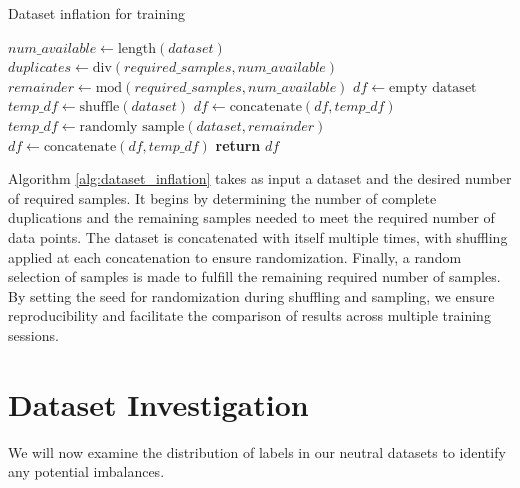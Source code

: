 \begin{algorithm}[H]
    \caption{Dataset inflation for training}
    \begin{algorithmic}[1]
        \State $num\_available \gets \text{length}(dataset)$
        \State $duplicates \gets \text{div}(required\_samples, num\_available)$
        \State $remainder \gets \text{mod}(required\_samples, num\_available)$
        \State $df \gets \text{empty dataset}$
        \State $temp\_df \gets \text{shuffle}(dataset)$
        \State $df \gets \text{concatenate}(df, temp\_df)$
        \EndFor
        \State
        \State $temp\_df \gets \text{randomly sample}(dataset, remainder)$
        \State $df \gets \text{concatenate}(df, temp\_df)$
        \State
        \State \textbf{return} $df$
        \EndFunction
    \end{algorithmic}
    \label{alg:dataset_inflation}
\end{algorithm}

Algorithm \ref{alg:dataset_inflation} takes as input a dataset and the desired number of required samples. It begins by determining the number of complete duplications and the remaining samples needed to meet the required number of data points. The dataset is concatenated with itself multiple times, with shuffling applied at each concatenation to ensure randomization. Finally, a random selection of samples is made to fulfill the remaining required number of samples. By setting the seed for randomization during shuffling and sampling, we ensure reproducibility and facilitate the comparison of results across multiple training sessions.

\section{Dataset Investigation}
\label{label_imbalance}

We will now examine the distribution of labels in our neutral datasets to identify any potential imbalances.

\begin{table}[ht]
    \caption{Number of positive samples for each label across both neutral datasets}
    \label{tab:dataset-comparison}
\end{table}

